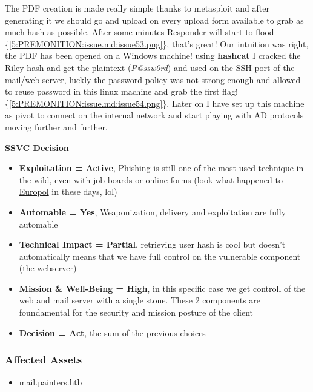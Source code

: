 \documentclass[a4paper]{article}
\def\tightlist{}
\begin{document}
The PDF creation is made really simple thanks to metasploit and after generating it we should go and upload on every upload form available to grab as much hash as possible.
After some minutes Responder will start to flood \{\ref{5:PREMONITION:issue.md:issue53.png}\}, that's great! Our intuition was right, the PDF has been opened on a Windows machine!
using \textbf{hashcat} I cracked the Riley hash and get the plaintext (\emph{P@ssw0rd}) and used on the SSH port of the mail/web server, luckly the password policy was not strong enough and allowed to reuse password in this linux machine
and grab the first flag! \{\ref{5:PREMONITION:issue.md:issue54.png}\}.
Later on I have set up this machine as pivot to connect on the internal network and start playing with AD protocols moving further and further.

\textbf{SSVC Decision}

\begin{itemize}
\tightlist
\item
  \textbf{Exploitation = Active}, Phishing is still one of the most used technique in the wild, even with job boards or online forms (look what happened to \href{https://beyondmachines.net/event_details/europol-confirms-portal-hack-claims-no-operational-data-impacted-g-0-8-y-a}{Europol} in these days, lol)
\item
  \textbf{Automable = Yes}, Weaponization, delivery and exploitation are fully automable
\item
  \textbf{Technical Impact = Partial}, retrieving user hash is cool but doesn't automatically means that we have full control on the vulnerable component (the webserver)
\item
  \textbf{Mission \& Well-Being = High}, in this specific case we get controll of the web and mail server with a single stone. These 2 components are foundamental for the security and mission posture of the client
\item
  \textbf{Decision = Act}, the sum of the previous choices
\end{itemize}

    
    \subsubsection{Affected Assets}

    \begin{itemize}
\tightlist
\item
  mail.painters.htb
\end{itemize}
\end{document}
